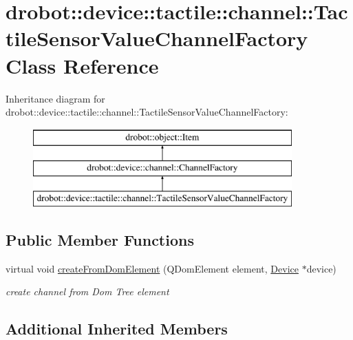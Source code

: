 \hypertarget{classdrobot_1_1device_1_1tactile_1_1channel_1_1TactileSensorValueChannelFactory}{\section{drobot\-:\-:device\-:\-:tactile\-:\-:channel\-:\-:Tactile\-Sensor\-Value\-Channel\-Factory Class Reference}
\label{classdrobot_1_1device_1_1tactile_1_1channel_1_1TactileSensorValueChannelFactory}
}
Inheritance diagram for drobot\-:\-:device\-:\-:tactile\-:\-:channel\-:\-:Tactile\-Sensor\-Value\-Channel\-Factory\-:\begin{figure}[H]
\begin{center}
\leavevmode
\includegraphics[height=3.000000cm]{classdrobot_1_1device_1_1tactile_1_1channel_1_1TactileSensorValueChannelFactory}
\end{center}
\end{figure}
\subsection*{Public Member Functions}
\begin{DoxyCompactItemize}
\item 
virtual void \hyperlink{classdrobot_1_1device_1_1tactile_1_1channel_1_1TactileSensorValueChannelFactory_a2e4369c57cdd99f2c59469f6451e4c0c}{create\-From\-Dom\-Element} (Q\-Dom\-Element element, \hyperlink{classdrobot_1_1device_1_1Device}{Device} $\ast$device)
\begin{DoxyCompactList}\small\item\em create channel from Dom Tree element \end{DoxyCompactList}\end{DoxyCompactItemize}
\subsection*{Additional Inherited Members}



